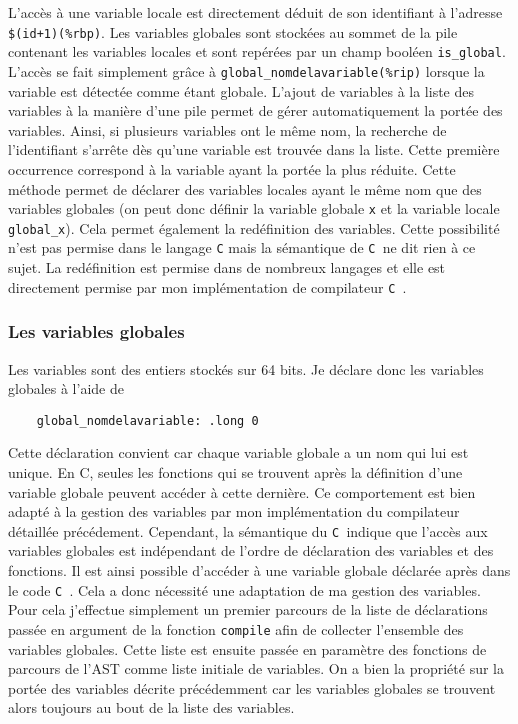 \documentclass[11pt]{article}
\newcommand{\Cmm}{\texttt{C\textminus\textminus\ }}
\newcommand{\ttt}[1]{\texttt{#1}}
\begin{document}
L'accès à une variable locale est directement déduit de son identifiant à l'adresse \ttt{\$(id+1)(\%rbp)}.
Les variables globales sont stockées au sommet de la pile contenant les variables locales et sont repérées par un champ booléen \ttt{is\_global}.
L'accès se fait simplement grâce à \ttt{global\_nomdelavariable(\%rip)} lorsque la variable est détectée comme étant globale.
L'ajout de variables à la liste des variables à la manière d'une pile permet de gérer automatiquement la portée des variables.
Ainsi, si plusieurs variables ont le même nom, la recherche de l'identifiant s'arrête dès qu'une variable est trouvée dans la liste.
Cette première occurrence correspond à la variable ayant la portée la plus réduite.
Cette méthode permet de déclarer des variables locales ayant le même nom que des variables globales (on peut donc définir la variable globale \ttt{x} et la variable locale \ttt{global\_x}).
Cela permet également la redéfinition des variables.
Cette possibilité n'est pas permise dans le langage \ttt{C} mais la sémantique de \Cmm ne dit rien à ce sujet.
La redéfinition est permise dans de nombreux langages et elle est directement permise par mon implémentation de compilateur \Cmm.

\subsubsection{Les variables globales}
Les variables sont des entiers stockés sur 64 bits. Je déclare donc les variables globales à l'aide de
\begin{lstlisting}
    global_nomdelavariable: .long 0
\end{lstlisting}
Cette déclaration convient car chaque variable globale a un nom qui lui est unique.
En C, seules les fonctions qui se trouvent après la définition d'une variable globale peuvent accéder à cette dernière.
Ce comportement est bien adapté à la gestion des variables par mon implémentation du compilateur détaillée précédement.
Cependant, la sémantique du \Cmm indique que l'accès aux variables globales est indépendant de l'ordre de déclaration des variables et des fonctions.
Il est ainsi possible d'accéder à une variable globale déclarée après dans le code \Cmm.
Cela a donc nécessité une adaptation de ma gestion des variables.
Pour cela j'effectue simplement un premier parcours de la liste de déclarations passée en argument de la fonction \ttt{compile} afin de collecter l'ensemble des variables globales.
Cette liste est ensuite passée en paramètre des fonctions de parcours de l'AST comme liste initiale de variables.
On a bien la propriété sur la portée des variables décrite précédemment car les variables globales se trouvent alors toujours au bout de la liste des variables.
\end{document}
